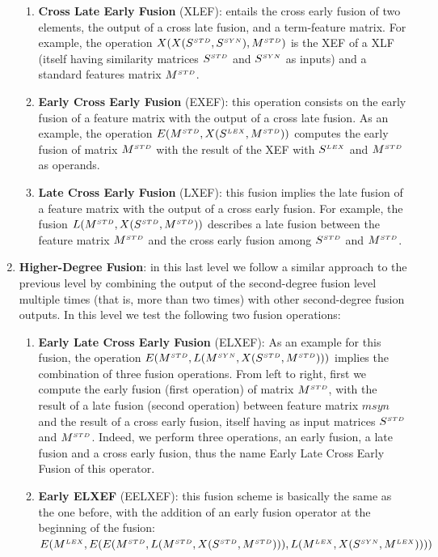 \begin{enumerate}
\begin{enumerate}
\item \textbf{Cross Late Early Fusion} (XLEF): entails the cross early fusion of two elements, the output of a cross late fusion, and a term-feature matrix. For example, the operation $X(X(S^{\scriptscriptstyle STD}, S^{\scriptscriptstyle SYN}), M^{\scriptscriptstyle STD})$ is the XEF of a XLF (itself having similarity matrices $S^{\scriptscriptstyle STD}$ and $S^{\scriptscriptstyle SYN}$ as inputs) and a standard features matrix $M^{\scriptscriptstyle STD}$.

%
\item \textbf{Early Cross Early Fusion} (EXEF):  this operation consists on the early fusion of a feature matrix with the output of a cross late fusion. As an example, the operation $E(M^{\scriptscriptstyle STD},X(S^{\scriptscriptstyle LEX}, M^{\scriptscriptstyle STD}))$ computes the early fusion of matrix $M^{\scriptscriptstyle STD}$ with the result of the XEF with $S^{\scriptscriptstyle LEX}$ and $M^{\scriptscriptstyle STD}$ as operands. 
%

\item \textbf{Late Cross Early Fusion} (LXEF): this fusion implies the late fusion of a feature matrix with the output of a cross early fusion. For example, the fusion $L(M^{\scriptscriptstyle STD}, X(S^{\scriptscriptstyle STD}, M^{\scriptscriptstyle STD}))$ describes a late fusion between the feature matrix $M^{\scriptscriptstyle STD}$ and the cross early fusion among $S^{\scriptscriptstyle STD}$ and $M^{\scriptscriptstyle STD}$.
\end{enumerate}

\item \textbf{Higher-Degree Fusion}: in this last level we follow a similar approach to the previous level by combining the output of the second-degree fusion level multiple times (that is, more than two times) with other second-degree fusion outputs. In this level we test the following two fusion operations:
\begin{enumerate}
\item \textbf{Early Late Cross Early Fusion} (ELXEF): As an example for this fusion, the operation $E(M^{\scriptscriptstyle STD}, \allowbreak L(M^{\scriptscriptstyle SYN}, X(S^{\scriptscriptstyle STD}, M^{\scriptscriptstyle STD})))$ implies the combination of three fusion operations. From left to right, first we compute the early fusion (first operation) of  matrix $M^{\scriptscriptstyle STD}$, with the result of a late fusion (second operation) between feature matrix $msyn$ and the result of a cross early fusion, itself having as input matrices $S^{\scriptscriptstyle STD}$ and $M^{\scriptscriptstyle STD}$. Indeed, we perform three operations, an early fusion, a late fusion and a cross early fusion, thus the name Early Late Cross Early Fusion of this operator.
\item \textbf{Early ELXEF} (EELXEF): this fusion scheme is basically the same as the one before, with the addition of an early fusion operator at the beginning of the fusion:  $E(M^{\scriptscriptstyle LEX}, E(E(M^{\scriptscriptstyle STD},  L(M^{\scriptscriptstyle STD}, X(S^{\scriptscriptstyle STD}, M^{\scriptscriptstyle STD}))),\allowbreak L(M^{\scriptscriptstyle LEX}, X(S^{\scriptscriptstyle SYN}, M^{\scriptscriptstyle LEX}))))$
\end{enumerate}



\end{enumerate}
